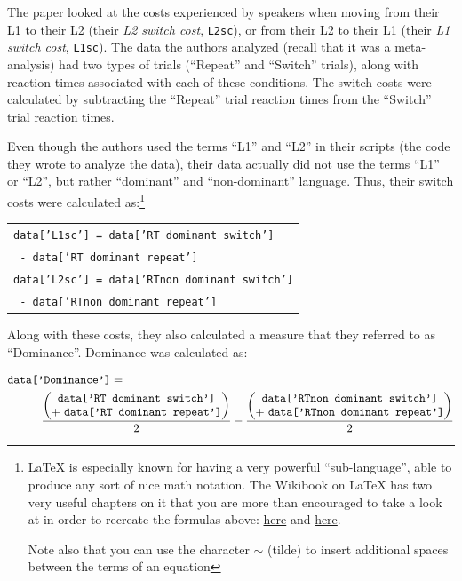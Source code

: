 \documentclass[11pt,a4paper]{scrartcl}
\begin{document}
The paper looked at the costs experienced by speakers when moving from their L1 to
their L2 (their \textit{L2 switch cost}, \texttt{L2sc}), or from their L2 to their L1 (their \textit{L1 switch cost}, \texttt{L1sc}). 
The data the authors analyzed (recall that it was a meta-analysis) had two types
of trials (“Repeat” and “Switch” trials), along with reaction times associated with each
of these conditions. The switch costs were calculated by subtracting the “Repeat” trial
reaction times from the “Switch” trial reaction times.


Even though the authors used the terms “L1” and “L2” in their scripts (the code
they wrote to analyze the data), their data actually did not use the terms “L1” or “L2”,
but rather “dominant” and “non-dominant” language. Thus, their switch costs were
calculated as:\footnote{LaTeX is especially known for having a very powerful “sub-language”, able to produce any sort of nice math notation. The Wikibook on LaTeX has two very useful chapters on it that you are more than encouraged to take a look at in order to recreate the formulas above: \href{https://en.wikibooks.org/wiki/LaTeX/Mathematics}{here} and 
\href{https://en.wikibooks.org/wiki/LaTeX/Advanced_Mathematics}{here}.

Note also that you can use the character $\sim$ (tilde) to insert additional spaces between the terms of an equation}

\begin{center}
\begin{tabular}{l}
\texttt{data['L1sc'] = data['RT dominant switch']} \\
\texttt{\phantom{data['L1sc'] = } - data['RT dominant repeat']} \\[0.5em]
\texttt{data['L2sc'] = data['RTnon dominant switch']} \\
\texttt{\phantom{data['L2sc'] = } - data['RTnon dominant repeat']}
\end{tabular}
\end{center}

\newpage
Along with these costs, they also calculated a measure that they referred to as “Dominance”. Dominance was calculated as:

\[
\begin{aligned}
\texttt{data['Dominance']} &={}\\
&\hspace{-6em}\dfrac{\begin{pmatrix}
\texttt{data['RT dominant switch']}\\
+\ \texttt{data['RT dominant repeat']}
\end{pmatrix}}{2}
- \dfrac{\begin{pmatrix}
\texttt{data['RTnon dominant switch']}\\
+\ \texttt{data['RTnon dominant repeat']}
\end{pmatrix}}{2}
\end{aligned}
\]
\end{document}
